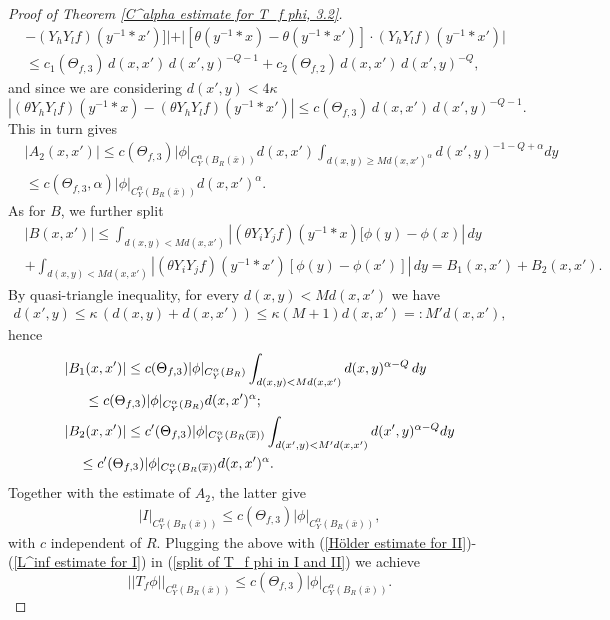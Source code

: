 \documentclass{article}
\numberwithin{equation}{section}
\begin{document}
\begin{proof}[Proof of Theorem \ref{C^alpha estimate for T_f phi, 3.2}]
\begin{align*}
        & -(Y_h Y_l f)(y^{-1}*x')]|+ |[\theta(y^{-1}*x)-\theta(y^{-1}*x')] \cdot (Y_h Y_l f)(y^{-1}*x')| \\
        & \leq c_1(\Theta_{f,3}) \, d(x,x') \, d(x',y)^{-Q-1} + c_2(\Theta_{f,2}) \, d(x,x') \, d(x',y)^{-Q},
    \end{align*}
    and since we are considering $d(x',y)<4\kappa$
    \begin{equation*}
        |(\theta Y_h Y_l f)(y^{-1}*x)-(\theta Y_h Y_l f)(y^{-1}*x')| \leq c(\Theta_{f,3}) \, d(x,x') \, d(x',y)^{-Q-1}.
    \end{equation*}
    This in turn gives 
    \begin{align*}
        & |A_2(x,x')| \leq c(\Theta_{f,3}) |\phi|_{C^{\alpha}_Y(B_R(\overline{x}))} d(x,x') \int_{d(x,y) \geq Md(x,x')^{\alpha}} d(x',y)^{-1-Q+\alpha} dy \\
        & \leq c(\Theta_{f,3},\alpha)  |\phi|_{C^{\alpha}_Y(B_R(\overline{x}))} d(x,x')^{\alpha}.
    \end{align*}
    As for $B$, we further split
    \begin{align*}
        & |B(x,x')| \leq \int_{d(x,y)<Md(x,x')} |(\theta Y_i Y_j f)(y^{-1}*x) [\phi(y)-\phi(x)| \, dy \\
        & + \int_{d(x,y)<Md(x,x')} |(\theta Y_i Y_j f)(y^{-1}*x') [\phi(y)-\phi(x')]| \, dy = B_1(x,x')+B_2(x,x').
    \end{align*}
    By quasi-triangle inequality, for every $d(x,y)<Md(x,x')$ we have
    \begin{align*}
        d(x',y) \leq \kappa \, (d(x,y)+d(x,x')) \leq \kappa (M+1) d(x,x') =: M' d(x,x'),
    \end{align*}
    hence
    \begin{align*}
        & |B_1(x,x')| \leq c(\Theta_{f,3}) |\phi|_{C^{\alpha}_Y(B_R)} \int_{d(x,y)<Md(x,x')} d(x,y)^{\alpha-Q} \, dy \\
        & \hspace{5mm}\leq c(\Theta_{f,3}) |\phi|_{C^{\alpha}_Y(B_R)} d(x,x')^{\alpha};
        \\
        & |B_2(x,x')| \leq c'(\Theta_{f,3}) |\phi|_{C^{\alpha}_Y(B_R(\overline{x}))} \int_{d(x',y)<M'd(x,x')} d(x',y)^{\alpha-Q} dy \\
        & \quad \leq c'(\Theta_{f,3}) |\phi|_{C^{\alpha}_Y(B_R(\overline{x}))} d(x,x')^{\alpha}.
    \end{align*}
    Together with the estimate of $A_2$, the latter give
    \begin{align*}
        |I|_{C^{\alpha}_Y(B_R(\overline{x}))} \leq c(\Theta_{f,3}) |\phi|_{C^{\alpha}_Y(B_R(\overline{x}))},
    \end{align*}
    with $c$ independent of $R$. Plugging the above with (\ref{Hölder estimate for II})-(\ref{L^inf estimate for I}) in (\ref{split of T_f phi in I and II}) we achieve
    \begin{equation*}
        ||T_f \phi||_{C^{\alpha}_Y(B_R(\overline{x}))} \leq c(\Theta_{f,3}) |\phi|_{C^{\alpha}_Y(B_R(\overline{x}))}.
    \end{equation*}
\end{proof}
\end{document}
